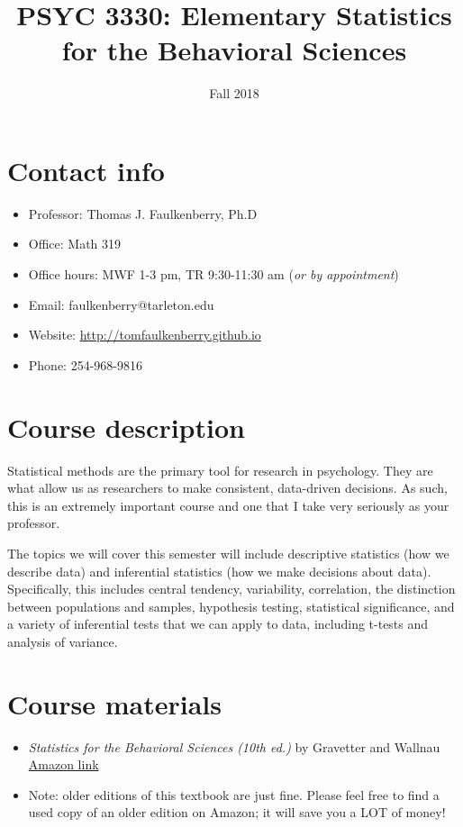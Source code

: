 \documentclass[10pt]{article}
\date{Fall 2018}
\title{PSYC 3330: Elementary Statistics for the Behavioral Sciences}
\begin{document}
\maketitle

\section*{Contact info}
\label{sec:orgee31cfa}
\begin{itemize}
\item Professor: Thomas J. Faulkenberry, Ph.D
\item Office: Math 319
\item Office hours: MWF 1-3 pm, TR 9:30-11:30 am (\emph{or by appointment})
\item Email: faulkenberry@tarleton.edu
\item Website: \url{http://tomfaulkenberry.github.io}
\item Phone: 254-968-9816
\end{itemize}

\section*{Course description}
\label{sec:org209d1a8}

Statistical methods are the primary tool for research in psychology.  
They are what allow us as researchers to make consistent, data-driven 
decisions.  As such, this is an extremely important course and one that I 
take very seriously as your professor.

The topics we will cover this semester will include descriptive statistics 
(how we describe data) and inferential statistics (how we make decisions 
about data).  Specifically, this includes central tendency, variability, 
correlation, the distinction between populations and samples, hypothesis 
testing, statistical significance, and a variety of inferential tests 
that we can apply to data, including t-tests and analysis of variance.

\section*{Course materials}
\label{sec:org093c946}
\begin{itemize}
\item \emph{Statistics for the Behavioral Sciences (10th ed.)} by Gravetter and Wallnau \href{http://www.amazon.com/Statistics-Behavioral-Sciences-MindTap-Psychology/dp/1305504917/}{Amazon link}
\item Note:  older editions of this textbook are just fine.  Please feel free to find a used copy of an older edition on Amazon; it will save you a LOT of money!
\end{itemize}
\end{document}
